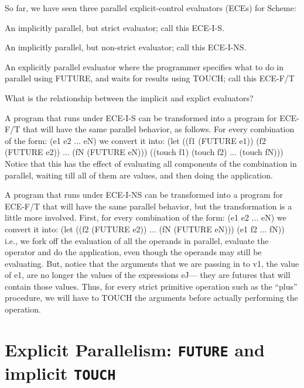 So far, we have seen three parallel explicit-control evaluators (ECEs) for Scheme:
\begin{tightlist}

\item An implicitly parallel, but strict evaluator; call this ECE-I-S.

\item An implicitly parallel, but non-strict evaluator; call this ECE-I-NS.

\item An explicitly parallel evaluator where the programmer specifies what to
do in parallel using {\cf FUTURE},  and waits for results using {\cf TOUCH};
call this ECE-F/T

\end{tightlist}
What is the relationship between the implicit and explict evaluators?

A program that runs under ECE-I-S can be transformed into a program for ECE-F/T
that will have the same parallel behavior,  as follows.  For every
combination of the form:
\beginlisp
(e1 e2 ... eN)
\endlisp
we convert it into:
\beginlisp
(let
      ((f1 (FUTURE e1))
       (f2 (FUTURE e2))
       ...
       (fN (FUTURE eN)))
  ((touch f1) (touch f2) ... (touch fN)))
\endlisp
Notice that this has the effect of evaluating all components of the
combination in parallel, waiting till all of them are values, and then doing
the application.

A program that runs under ECE-I-NS can be transformed into a program for ECE-F/T
that will have the same parallel behavior,  but the transformation is a
little more involved.  First, for every combination of the form:
\beginlisp
(e1 e2 ... eN)
\endlisp
we convert it into:
\beginlisp
(let
      ((f2 (FUTURE e2))
       ...
       (fN (FUTURE eN)))
  (e1 f2 ... fN))
\endlisp
i.e., we fork off the evaluation of all the operands in parallel, evaluate
the operator and do the application, even though the operands may still be
evaluating.  But, notice that the arguments that we are passing in to {\cf
v1}, the value of {\cf e1}, are no longer the values of the expressions {\cf
eJ}--- they are futures that will contain those values.  Thus, for every
strict primitive operation such as the ``plus'' procedure, we will have to
{\cf TOUCH} the arguments before actually performing the operation.

\section{Explicit Parallelism: {\tt FUTURE} and implicit {\tt TOUCH}}

